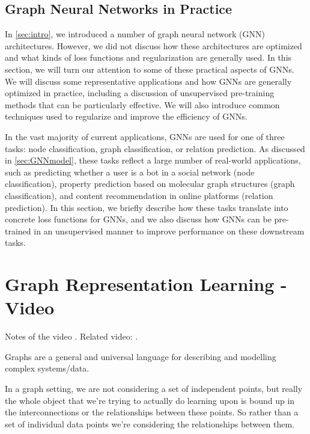 \documentclass[10pt]{book}
\begin{document}
\section{Graph Neural Networks in Practice}

In \autoref{sec:intro}, we introduced a number of graph neural network (GNN) architectures. However, we did not discuss how these architectures are optimized and what kinds of loss functions and regularization are generally used. In this section, we will turn our attention to some of these practical aspects of GNNs. We will discuss some representative applications and how GNNs are generally optimized in practice, including a discussion of unsupervised pre-training methods that can be particularly effective. We will also introduce common techniques used to regularize and improve the efficiency of GNNs.

In the vast majority of current applications, GNNs are used for one of three tasks: node classification, graph classification, or relation prediction. As discussed in \autoref{sec:GNNmodel}, these tasks reflect a large number of real-world applications, such as predicting whether a user is a bot in a social network (node classification), property prediction based on molecular graph structures (graph classification), and content recommendation in online platforms (relation prediction). In this section, we briefly describe how these tasks translate into concrete loss functions for GNNs, and we also discuss how GNNs can be pre-trained in an unsupervised manner to improve performance on these downstream tasks.






\chapter{Graph Representation Learning - Video}

Notes of the video \cite{HamiltonGRLVideo}. Related video: \cite{PetarTF-GNN}.

Graphs are a general and universal language for describing and modelling complex systems/data.

In a graph setting, we are not considering a set of independent points, but really the whole object that we're trying to actually do learning upon is bound up in the interconnections or the relationships between these points. So rather than a set of individual data points we're considering the relationships between them.
\end{document}
